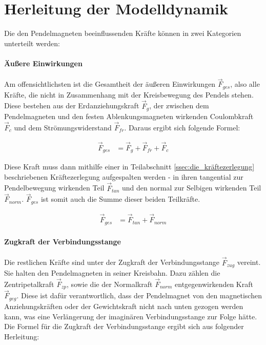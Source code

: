 \section{Herleitung der Modelldynamik}
\label{sec:herleitung_der_modelldynamik}

Die den Pendelmagneten beeinflussenden Kräfte können in zwei Kategorien unterteilt werden:

\paragraph{Äußere Einwirkungen} Am offensichtlichsten ist die Gesamtheit der äußeren Einwirkungen $\vec{F}_{ges}$, also alle Kräfte, die nicht in Zusammenhang mit der Kreisbewegung des Pendels stehen. Diese bestehen aus der Erdanziehungskraft $\vec{F}_{g}$, der zwischen dem Pendelmagneten und den festen Ablenkungsmagneten wirkenden Coulombkraft $\vec{F}_{c}$ und dem Strömungswiderstand $\vec{F}_{fr}$. Daraus ergibt sich folgende Formel:

\begin{align} \label{f_ges}
    \vec{F}_{ges} &= \vec{F}_{g} + \vec{F}_{fr} + \vec{F}_{c}
\end{align}

Diese Kraft muss dann mithilfe einer in Teilabschnitt \ref{ssec:die_kräftezerlegung} beschriebenen Kräftezerlegung aufgespalten werden - in ihren tangential zur Pendelbewegung wirkenden Teil $\vec{F}_{tan}$ und den normal zur Selbigen wirkenden Teil $\vec{F}_{norm}$. $\vec{F}_{ges}$ ist somit auch die Summe dieser beiden Teilkräfte.

\begin{align} \label{f_ges_kräftezerlegung}
    \vec{F}_{ges} &= \vec{F}_{tan} + \vec{F}_{norm}
\end{align}

\paragraph{Zugkraft der Verbindungsstange} Die restlichen Kräfte sind unter der Zugkraft der Verbindungsstange $\vec{F}_{zug}$ vereint. Sie halten den Pendelmagneten in seiner Kreisbahn. Dazu zählen die Zentripetalkraft $\vec{F}_{zp}$, sowie die der Normalkraft $\vec{F}_{norm}$ entgegenwirkenden Kraft $\vec{F}_{geg}$. Diese ist dafür verantwortlich, dass der Pendelmagnet von den magnetischen Anziehungskräften oder der Gewichtskraft nicht nach unten gezogen werden kann, was eine Verlängerung der imaginären Verbindungsstange zur Folge hätte. Die Formel für die Zugkraft der Verbindungsstange ergibt sich aus folgender Herleitung:

